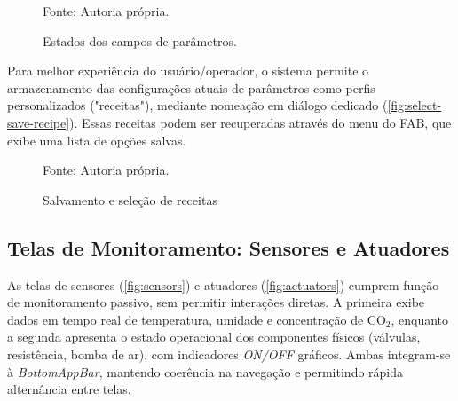 \begin{figure}[H]
    \caption{Estados dos campos de parâmetros.}
    \label{fig:parameters-state}
    \centering
    \hfill
    \hfill
    \hfill
    \hfill

    {\centering\footnotesize Fonte: Autoria própria.\par}

  \end{figure}


Para melhor experiência do usuário/operador, o sistema permite o armazenamento das configurações atuais de parâmetros como perfis personalizados ("receitas"), mediante nomeação em diálogo dedicado (\autoref{fig:select-save-recipe}). Essas receitas podem ser recuperadas através do menu do FAB, que exibe uma lista de opções salvas.

\begin{figure}[H]
    \caption{Salvamento e seleção de receitas}
    \label{fig:select-save-recipe}
    \centering
    \hfill
    \hfill
    \hfill

    {\centering\footnotesize Fonte: Autoria própria.\par}

  \end{figure}

\subsection{Telas de Monitoramento: Sensores e Atuadores}\label{subsec:monitoramento}
As telas de sensores (\autoref{fig:sensors}) e atuadores (\autoref{fig:actuators}) cumprem função de monitoramento passivo, sem permitir interações diretas. A primeira exibe dados em tempo real de temperatura, umidade e concentração de CO$_2$, enquanto a segunda apresenta o estado operacional dos componentes físicos (válvulas, resistência, bomba de ar), com indicadores \textit{ON/OFF} gráficos. Ambas integram-se à \textit{BottomAppBar}, mantendo coerência na navegação e permitindo rápida alternância entre telas.

